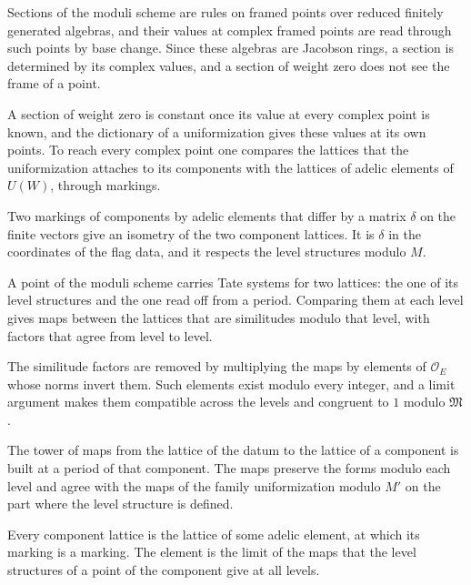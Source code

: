 Sections of the moduli scheme are rules on framed points over reduced finitely generated algebras, and their values
at complex framed points are read through such points by base change. Since these algebras are Jacobson rings, a
section is determined by its complex values, and a section of weight zero does not see the frame of a point.

A section of weight zero is constant once its value at every complex point is known, and the dictionary of a
uniformization gives these values at its own points. To reach every complex point one compares the lattices that the
uniformization attaches to its components with the lattices of adelic elements of $U(W)$, through markings.

Two markings of components by adelic elements that differ by a matrix $\delta$ on the finite vectors give an isometry
of the two component lattices. It is $\delta$ in the coordinates of the flag data, and it respects the level
structures modulo $M$.

A point of the moduli scheme carries Tate systems for two lattices: the one of its level structures and the one read
off from a period. Comparing them at each level gives maps between the lattices that are similitudes modulo that
level, with factors that agree from level to level.

The similitude factors are removed by multiplying the maps by elements of $\mathcal O_E$ whose norms invert them.
Such elements exist modulo every integer, and a limit argument makes them compatible across the levels and congruent
to $1$ modulo $\mathfrak M$.

The tower of maps from the lattice of the datum to the lattice of a component is built at a period of that component.
The maps preserve the forms modulo each level and agree with the maps of the family uniformization modulo $M'$ on the
part where the level structure is defined.

Every component lattice is the lattice of some adelic element, at which its marking is a marking. The element is
the limit of the maps that the level structures of a point of the component give at all levels.

